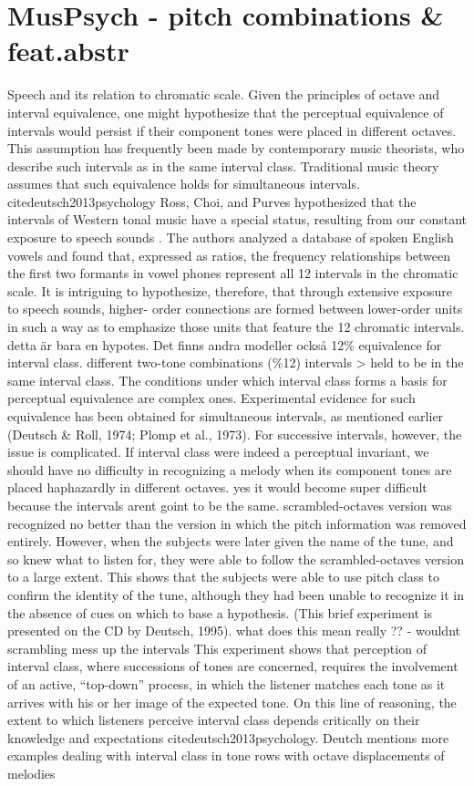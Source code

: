 \section{MusPsych - pitch combinations & feat.abstr}
Speech and its relation to chromatic scale. Given the principles of octave and interval equivalence, one might hypothesize that the perceptual equivalence of intervals would persist if their component tones were placed in different octaves. This assumption has frequently been made by contemporary music theorists, who describe such intervals as in the same interval class. Traditional music theory assumes that such equivalence holds for simultaneous intervals. cite{deutsch2013psychology}
 Ross, Choi, and Purves hypothesized that the intervals of Western tonal music have a special status, resulting from our constant exposure to speech sounds \cite{ross2007musical}. The authors analyzed a database of spoken English vowels and found that, expressed as ratios, the frequency relationships between the first two formants in vowel phones represent all 12 intervals in the chromatic scale. It is intriguing to hypothesize, therefore, that through extensive exposure to speech sounds, higher- order connections are formed between lower-order units in such a way as to emphasize those units that feature the 12 chromatic intervals. detta är bara en hypotes. Det finns andra modeller också
12\% equivalence for interval class. different two-tone combinations (\%12) intervals > held to be in the same interval class. The conditions under which interval class forms a basis for perceptual equivalence are complex ones. Experimental evidence for such equivalence has been obtained for simultaneous intervals, as mentioned earlier (Deutsch & Roll, 1974; Plomp et al., 1973). For successive intervals, however, the issue is complicated. If interval class were indeed a perceptual invariant, we should have no difficulty in recognizing a melody when its component tones are placed haphazardly in different octaves. \cite{deutsch1974error} \cite{plomp1973musical} \cite{deutsch1972octave}  yes it would become super difficult because the intervals arent goint to be the same. scrambled-octaves version was recognized no better than the version in which the pitch information was removed entirely. However, when the subjects were later given the name of the tune, and so knew what to listen for, they were able to follow the scrambled-octaves version to a large extent. This shows that the subjects were able to use pitch class to confirm the identity of the tune, although they had been unable to recognize it in the absence of cues on which to base a hypothesis. (This brief experiment is presented on the CD by Deutsch, 1995). \cite{deutsch1975facilitation} what does this mean really ?? - wouldnt scrambling mess up the intervals This experiment shows that perception of interval class, where successions of tones are concerned, requires the involvement of an active, “top-down” process, in which the listener matches each tone as it arrives with his or her image of the expected tone. On this line of reasoning, the extent to which listeners perceive interval class depends critically on their knowledge and expectations cite{deutsch2013psychology}. Deutch mentions more examples dealing with interval class in tone rows with octave displacements of melodies
